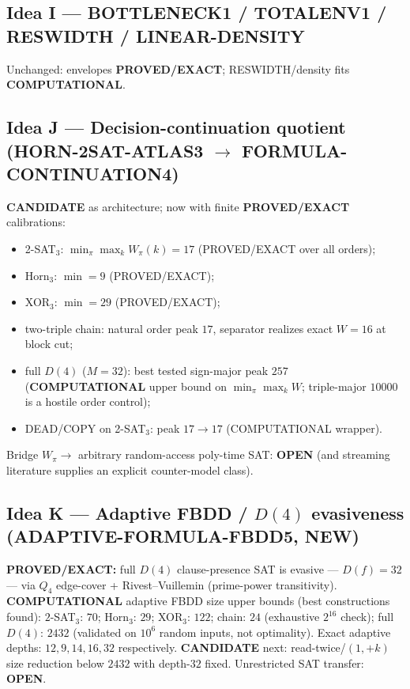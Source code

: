 \documentclass[11pt]{article}
\begin{document}
\subsection*{Idea I --- BOTTLENECK1 / TOTALENV1 / RESWIDTH / LINEAR-DENSITY}
Unchanged: envelopes \textbf{PROVED/EXACT}; RESWIDTH/density fits \textbf{COMPUTATIONAL}.

\subsection*{Idea J --- Decision-continuation quotient (HORN-2SAT-ATLAS3 $\to$ FORMULA-CONTINUATION4)}
\textbf{CANDIDATE} as architecture; now with finite \textbf{PROVED/EXACT} calibrations:
\begin{itemize}
\item 2-SAT$_3$: $\min_\pi\max_k W_\pi(k)=17$ (PROVED/EXACT over all orders);
\item Horn$_3$: $\min=9$ (PROVED/EXACT);
\item XOR$_3$: $\min=29$ (PROVED/EXACT);
\item two-triple chain: natural order peak $17$, separator realizes exact $W=16$ at block cut;
\item full $D(4)$ ($M=32$): best tested sign-major peak $257$ (\textbf{COMPUTATIONAL} upper bound
  on $\min_\pi\max_k W$; triple-major $10000$ is a hostile order control);
\item DEAD/COPY on 2-SAT$_3$: peak $17\to17$ (COMPUTATIONAL wrapper).
\end{itemize}
Bridge $W_\pi\to$ arbitrary random-access poly-time SAT: \textbf{OPEN}
(and streaming literature supplies an explicit counter-model class).

\subsection*{Idea K --- Adaptive FBDD / $D(4)$ evasiveness (ADAPTIVE-FORMULA-FBDD5, NEW)}
\textbf{PROVED/EXACT:} full $D(4)$ clause-presence SAT is evasive --- $D(f)=32$ --- via
$Q_4$ edge-cover + Rivest--Vuillemin (prime-power transitivity).
\textbf{COMPUTATIONAL} adaptive FBDD size upper bounds (best constructions found):
$2$-SAT$_3$: $70$; Horn$_3$: $29$; XOR$_3$: $122$; chain: $24$ (exhaustive $2^{16}$ check);
full $D(4)$: $2432$ (validated on $10^6$ random inputs, not optimality).
Exact adaptive depths: $12,9,14,16,32$ respectively.
\textbf{CANDIDATE} next: read-twice/$(1,+k)$ size reduction below $2432$ with depth-$32$ fixed.
Unrestricted SAT transfer: \textbf{OPEN}.
\end{document}
